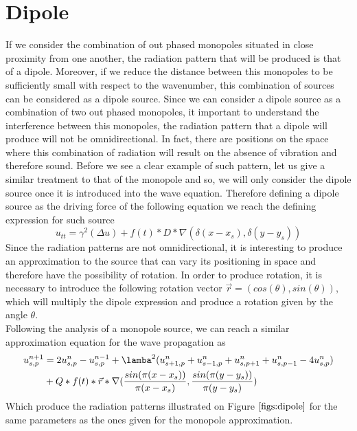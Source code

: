 \section{Dipole}
\label{chapter4:sec2}
If we consider the combination of out phased monopoles situated in close proximity from one another, the radiation pattern that will be produced is that of a dipole. Moreover, if we reduce the distance between this monopoles to be sufficiently small with respect to the wavenumber, this combination of sources can be considered as a dipole source. Since we can consider a dipole source as a combination of two out phased monopoles, it important to understand the interference between this monopoles, the radiation pattern that a dipole will produce will not be omnidirectional. In fact, there are positions on the space where this combination of radiation will result on the absence of vibration and therefore sound. 
Before we see a clear example of such pattern, let us give a similar treatment to that of the monopole and so, we will only consider the dipole source once it is introduced into the wave equation. Therefore defining a dipole source as the driving force of the following equation we reach the defining expression for such source
\begin{equation}
\label{eqn:Dipole}
	u_{tt}=\gamma^{2}(\Delta u) + f(t)*D*\nabla(\delta(x-x_{s}),\delta(y-y_{s}))
\end{equation}
Since the radiation patterns are not omnidirectional, it is interesting to produce an approximation to the source that can vary its positioning in space and therefore have the possibility of rotation. In order to produce rotation, it is necessary to introduce the following rotation vector $\vec{r}=(cos(\theta),sin(\theta))$, which will multiply the dipole expression and produce a rotation given by the angle $\theta$.\\
Following the analysis of a monopole source, we can reach a similar approximation equation for the wave propagation as
\begin{equation}
\label{eqn:FD5dipo}
	\begin{aligned}
	u^{n+1}_{s,p}&=2u^{n}_{s,p}-u^{n-1}_{s,p}+\lamba^{2}(u^{n}_{s+1,p}+u^{n}_{s-1,p}+u^{n}_{s,p+1}+u^{n}_{s,p-1}-4u^{n}_{s,p}) \\
			&+ Q*f(t)*\vec{r}*\nabla(\frac{sin(\pi(x-x_{s}))}{\pi(x-x_{s})},\frac{sin(\pi(y-y_{s}))}{\pi(y-y_{s})})
	\end{aligned}
\end{equation}
Which produce the radiation patterns illustrated on Figure $\ref{figs:dipole}$ for the same parameters as the ones given for the monopole approximation.
